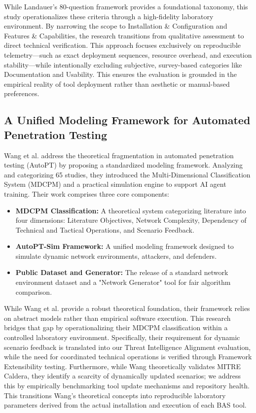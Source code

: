 While Landauer’s 80-question framework provides a foundational taxonomy, this study operationalizes these criteria through a high-fidelity laboratory environment. By narrowing the scope to Installation \& Configuration and Features \& Capabilities, the research transitions from qualitative assessment to direct technical verification. This approach focuses exclusively on reproducible telemetry—such as exact deployment sequences, resource overhead, and execution stability—while intentionally excluding subjective, survey-based categories like Documentation and Usability. This ensures the evaluation is grounded in the empirical reality of tool deployment rather than aesthetic or manual-based preferences.

\subsection{A Unified Modeling Framework for Automated Penetration Testing}
Wang et al. \cite{wang2025} address the theoretical fragmentation in automated penetration testing (AutoPT) by proposing a standardized modeling framework. Analyzing and categorizing 65 studies, they introduced the Multi-Dimensional Classification System (MDCPM) and a practical simulation engine to support AI agent training. Their work comprises three core components:
\begin{itemize}
    \item \textbf{MDCPM Classification:} A theoretical system categorizing literature into four dimensions: Literature Objectives, Network Complexity, Dependency of Technical and Tactical Operations, and Scenario Feedback.
    \item \textbf{AutoPT-Sim Framework:} A unified modeling framework designed to simulate dynamic network environments, attackers, and defenders.
    \item \textbf{Public Dataset and Generator:} The release of a standard network environment dataset and a "Network Generator" tool for fair algorithm comparison.
\end{itemize}

While Wang et al. provide a robust theoretical foundation, their framework relies on abstract models rather than empirical software execution. This research bridges that gap by operationalizing their MDCPM classification within a controlled laboratory environment. Specifically, their requirement for dynamic scenario feedback is translated into our Threat Intelligence Alignment evaluation, while the need for coordinated technical operations is verified through Framework Extensibility testing. Furthermore, while Wang theoretically validates MITRE Caldera, they identify a scarcity of dynamically updated scenarios; we address this by empirically benchmarking tool update mechanisms and repository health. This transitions Wang’s theoretical concepts into reproducible laboratory parameters derived from the actual installation and execution of each BAS tool. 

